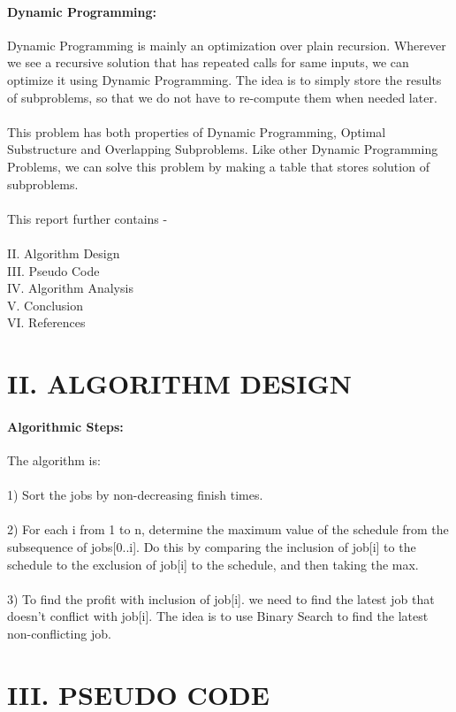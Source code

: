 \documentclass[10pt]{article}
\begin{document}
\begin{multicols*}{2}
\paragraph{Dynamic Programming:}Dynamic Programming is mainly an optimization over plain recursion. Wherever we see a recursive solution that has repeated calls for same inputs, we can optimize it using Dynamic Programming. The idea is to simply store the results of subproblems, so that we do not have to re-compute them when needed later.\\\\This problem has both properties of Dynamic Programming, Optimal Substructure and Overlapping Subproblems. Like other Dynamic Programming Problems, we can solve this problem by making a table that stores solution of subproblems.\\\\This report further contains -\\\\II. Algorithm Design\\III. Pseudo Code\\IV. Algorithm Analysis\\V. Conclusion\\VI. References


\section*{II. ALGORITHM DESIGN}
\paragraph{Algorithmic Steps:}The algorithm is:\\\\1) Sort the jobs by non-decreasing finish times.\\\\2) For each i from 1 to n, determine the maximum value of the schedule from the subsequence of jobs[0..i]. Do this by comparing the inclusion of job[i] to the schedule to the exclusion of job[i] to the schedule, and then taking the max.\\\\3) To find the profit with inclusion of job[i]. we need to find the latest job that doesn’t conflict with job[i]. The idea is to use Binary Search to find the latest non-conflicting job.


\section*{III. PSEUDO CODE}


\end{multicols*}
\end{document}
